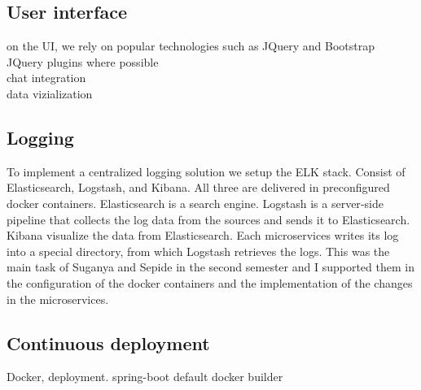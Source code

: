 \subsection{User interface}
on the UI, we rely on popular technologies such as JQuery and Bootstrap\\
JQuery plugins where possible\\
chat integration\\
data vizialization\\

\subsection{Logging}
To implement a centralized logging solution we setup the ELK stack. Consist of Elasticsearch, Logstash, and Kibana. All three are delivered in preconfigured docker containers. Elasticsearch is a search engine. Logstash is a server‑side pipeline that collects the log data from the sources and sends it to Elasticsearch. Kibana visualize the data from Elasticsearch. Each microservices writes its log into a special directory, from which Logstash retrieves the logs. This was the main task of Suganya and Sepide in the second semester and I supported them in the configuration of the docker containers and the implementation of the changes in the microservices.

\subsection{Continuous deployment}
Docker, deployment. spring-boot default docker builder\\